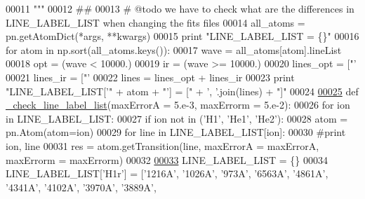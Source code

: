 \begin{DoxyCode}
00011 \textcolor{stringliteral}{    """}
00012     \textcolor{comment}{##}
00013     \textcolor{comment}{# @todo we have to check what are the differences in LINE\_LABEL\_LIST when changing the fits files}
00014     all\_atoms = pn.getAtomDict(*args, **kwargs)
00015     \textcolor{keywordflow}{print} \textcolor{stringliteral}{"LINE\_LABEL\_LIST = \{\}"}
00016     \textcolor{keywordflow}{for} atom \textcolor{keywordflow}{in} np.sort(all\_atoms.keys()):
00017         wave = all\_atoms[atom].lineList
00018         opt = (wave < 10000.)
00019         ir = (wave >= 10000.)
00020         lines\_opt = [\textcolor{stringliteral}{"'%
00021         lines\_ir = [\textcolor{stringliteral}{"'%
00022         lines = lines\_opt + lines\_ir
00023         \textcolor{keywordflow}{print} \textcolor{stringliteral}{"LINE\_LABEL\_LIST['"} + atom + \textcolor{stringliteral}{"'] = ["} + \textcolor{stringliteral}{', '}.join(lines) + \textcolor{stringliteral}{"]"}
00024 
\hypertarget{init_8py_source_l00025}{}\hyperlink{namespacepyneb_1_1utils_1_1init_a1032ff20f913ca4a766e36da2140ee97}{00025} \textcolor{keyword}{def }\hyperlink{namespacepyneb_1_1utils_1_1init_a1032ff20f913ca4a766e36da2140ee97}{\_check\_line\_label\_list}(maxErrorA = 5.e-3, maxErrorm = 5.e-2):
00026     \textcolor{keywordflow}{for} ion \textcolor{keywordflow}{in} LINE\_LABEL\_LIST:
00027         \textcolor{keywordflow}{if} ion \textcolor{keywordflow}{not} \textcolor{keywordflow}{in} (\textcolor{stringliteral}{'H1'}, \textcolor{stringliteral}{'He1'}, \textcolor{stringliteral}{'He2'}):
00028             atom = pn.Atom(atom=ion)
00029             \textcolor{keywordflow}{for} line \textcolor{keywordflow}{in} LINE\_LABEL\_LIST[ion]:
00030                 \textcolor{comment}{#print ion, line}
00031                 res = atom.getTransition(line, maxErrorA = maxErrorA, maxErrorm = maxErrorm)
00032             
\hypertarget{init_8py_source_l00033}{}\hyperlink{namespacepyneb_1_1utils_1_1init_a2db1385e0dfb34bdc19ec2e7491041b3}{00033} LINE\_LABEL\_LIST = \{\}
00034 LINE\_LABEL\_LIST[\textcolor{stringliteral}{'H1r'}] = [\textcolor{stringliteral}{'1216A'}, \textcolor{stringliteral}{'1026A'}, \textcolor{stringliteral}{'973A'}, \textcolor{stringliteral}{'6563A'}, \textcolor{stringliteral}{'4861A'}, \textcolor{stringliteral}{'4341A'}, \textcolor{stringliteral}{'4102A'}, \textcolor{stringliteral}{'3970A'}, \textcolor{stringliteral}{'3889A'},
}}
\end{DoxyCode}
